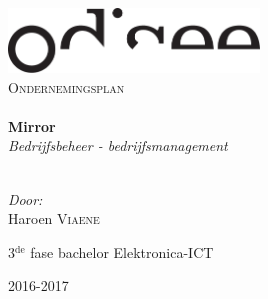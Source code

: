 \begin{titlepage}
\begin{center}
\includegraphics[width=0.5\textwidth]{./logo.pdf}~\\[1cm]


\textsc{\Large Ondernemingsplan}\\[0.5cm]

\HRule \\[0.4cm]
{ \LARGE \bfseries Mirror}\\[0.4cm]
{\large \textit{Bedrijfsbeheer - bedrijfsmanagement}}\\[0.2cm]

\HRule \\[1.5cm]

\begin{minipage}{0.4\textwidth}
\begin{flushleft} \large
\emph{Door:}\\
Haroen \textsc{Viaene}\\

\end{flushleft}
\end{minipage}
\begin{minipage}{0.4\textwidth}
\begin{flushright} \large
\large{3$^{\text{de}}$ fase bachelor Elektronica-ICT}\\
\end{flushright}
\end{minipage}

\vfill

{\large 2016-2017}

\end{center}
\end{titlepage}
